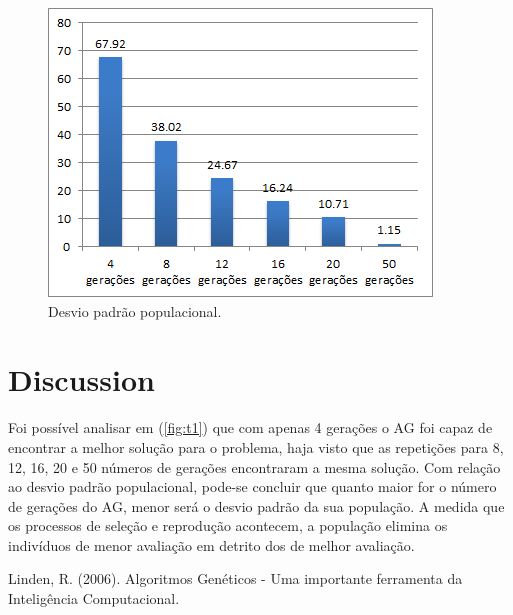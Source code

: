 \documentclass[twoside]{article}
\begin{document}
\begin{multicols}{2}
\begin{figure}[H]
\label{fig:t2}
  \caption{Desvio padrão populacional.}
  \centering
    \includegraphics[scale = 0.7]{test_aval2.png}
\end{figure}

\section{Discussion}
Foi possível analisar em (\ref{fig:t1}) que com apenas 4 gerações o AG foi capaz de encontrar a melhor solução para o problema, haja visto que as repetições para 8, 12, 16, 20 e 50 números de gerações encontraram a mesma solução. Com relação ao desvio padrão populacional, pode-se concluir que quanto maior for o número de gerações do AG, menor será o desvio padrão da sua população. A medida que os processos de seleção e reprodução acontecem, a população elimina os indivíduos de menor avaliação em detrito dos de melhor avaliação. 

\begin{thebibliography}{99} %

Linden, R. (2006).
\newblock Algoritmos Genéticos - Uma importante ferramenta da Inteligência Computacional.
 
\end{thebibliography}


\end{multicols}
\end{document}
